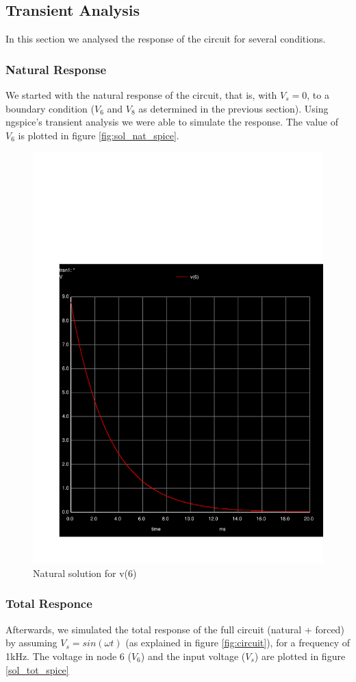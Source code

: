 \subsection{Transient Analysis}

In this section we analysed the response of the circuit for several
conditions.

\subsubsection{Natural Response}


We started with the natural response of the circuit, that is, 
with $V_s=0$, to a boundary condition ($V_6$ and $V_8$ as determined 
in the previous section).
Using ngspice's transient analysis we were able to simulate the response. 
The value of $V_6$ is plotted in figure \ref{fig:sol_nat_spice}.

\begin{figure}[h] \centering
  \includegraphics[width=0.4\linewidth]{trans.pdf}
  \caption{Natural solution for v(6)}
  \label{sol_nat_spice}
\end{figure}

\subsubsection{Total Responce}

Afterwards, we simulated the total response of the full circuit (natural 
+ forced) by assuming $V_s = sin(\omega t)$ (as explained in figure \ref{fig:circuit}), 
for a frequency of 1kHz.
The voltage in node 6 ($V_6$) and the input voltage ($V_s$) are plotted 
in figure \ref{sol_tot_spice}

